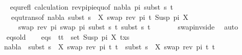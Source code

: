 \begin{isabellebody}
\ \ \ \ \isamarkupfalse%
\ equ{\isacharunderscore}{\kern0pt}refl\ calculation\ rev{\isacharunderscore}{\kern0pt}pi{\isacharunderscore}{\kern0pt}pi{\isacharunderscore}{\kern0pt}equ{\isacharbrackleft}{\kern0pt}of\ nabla{}\ pi\ {\isacartoucheopen}subst\ s{}\ t{\isacharprime}{\kern0pt}{\isacartoucheclose}{\isacharbrackright}{\kern0pt}\isanewline
\ \ \ \ \ \ equ{\isacharunderscore}{\kern0pt}trans{\isacharbrackleft}{\kern0pt}of\ nabla{}\ {\isacartoucheopen}subst\ {\isacharparenleft}{\kern0pt}s{}\ {\isasymbullet}\ {\isacharbrackleft}{\kern0pt}{\isacharparenleft}{\kern0pt}X{\isacharcomma}{\kern0pt}\ swap\ {\isacharparenleft}{\kern0pt}rev\ pi{\isacharparenright}{\kern0pt}\ t{\isacharprime}{\kern0pt}{\isacharparenright}{\kern0pt}{\isacharbrackright}{\kern0pt}{\isacharparenright}{\kern0pt}\ {\isacharparenleft}{\kern0pt}Susp\ pi\ X{\isacharparenright}{\kern0pt}{\isacartoucheclose}\ \isanewline
\ \ \ \ \ \ \ \ {\isacartoucheopen}swap\ {\isacharparenleft}{\kern0pt}rev\ pi{\isacharparenright}{\kern0pt}\ {\isacharparenleft}{\kern0pt}swap\ pi\ {\isacharparenleft}{\kern0pt}subst\ s{}\ t{\isacharprime}{\kern0pt}{\isacharparenright}{\kern0pt}{\isacharparenright}{\kern0pt}{\isacartoucheclose}\ {\isacartoucheopen}subst\ s{}\ t{\isacharprime}{\kern0pt}{\isacartoucheclose}{\isacharbrackright}{\kern0pt}\isanewline
\ \ \ \ \ \ \ swap{\isacharunderscore}{\kern0pt}inv{\isacharunderscore}{\kern0pt}side\ \isamarkupfalse%
\ auto\isanewline
\isanewline
\ \ \isamarkupfalse%
\ {}\ eqs{\isacharunderscore}{\kern0pt}old\isanewline
\ \ \isamarkupfalse%
\ eqs{\isacharcolon}{\kern0pt}\ {\isachardoublequoteopen}{\isasymforall}\ {\isacharparenleft}{\kern0pt}t{}{\isacharcomma}{\kern0pt}t{}{\isacharparenright}{\kern0pt}\ {\isasymin}\ set\ {\isacharparenleft}{\kern0pt}{\isacharparenleft}{\kern0pt}Susp\ pi\ X{\isacharcomma}{\kern0pt}\ t{\isacharprime}{\kern0pt}{\isacharparenright}{\kern0pt}{\isacharhash}{\kern0pt}xs{\isacharparenright}{\kern0pt}{\isachardot}{\kern0pt}\ \isanewline
\ \ \ \ nabla{}\ {\isasymturnstile}\ subst\ {\isacharparenleft}{\kern0pt}s{}\ {\isasymbullet}\ {\isacharbrackleft}{\kern0pt}{\isacharparenleft}{\kern0pt}X{\isacharcomma}{\kern0pt}\ swap\ {\isacharparenleft}{\kern0pt}rev\ pi{\isacharparenright}{\kern0pt}\ t{\isacharprime}{\kern0pt}{\isacharparenright}{\kern0pt}{\isacharbrackright}{\kern0pt}{\isacharparenright}{\kern0pt}\ t{}\ {\isasymapprox}\ subst\ {\isacharparenleft}{\kern0pt}s{}\ {\isasymbullet}\ {\isacharbrackleft}{\kern0pt}{\isacharparenleft}{\kern0pt}X{\isacharcomma}{\kern0pt}\ swap\ {\isacharparenleft}{\kern0pt}rev\ pi{\isacharparenright}{\kern0pt}\ t{\isacharprime}{\kern0pt}{\isacharparenright}{\kern0pt}{\isacharbrackright}{\kern0pt}{\isacharparenright}{\kern0pt}\ t{}{\isachardoublequoteclose}\isanewline

\end{isabellebody}
